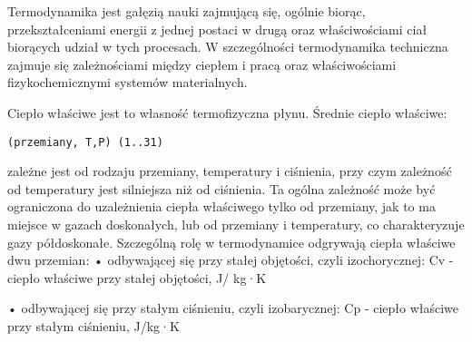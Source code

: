 \documentclass[]{article}
\date{}
\begin{document}
Termodynamika jest gałęzią nauki zajmującą się, ogólnie biorąc,
przekształceniami energii z jednej postaci w drugą oraz właściwościami
ciał biorących udział w tych procesach. W szczególności termodynamika
techniczna zajmuje się zależnościami między ciepłem i pracą oraz
właściwościami fizykochemicznymi systemów materialnych.

Ciepło właściwe jest to własność termofizyczna płynu. Średnie ciepło
właściwe:

\texttt{(przemiany,~T,P)~(1..31)}

zależne jest od rodzaju przemiany, temperatury i ciśnienia, przy czym
zależność od temperatury jest silniejsza niż od ciśnienia. Ta ogólna
zależność może być ograniczona do uzależnienia ciepła właściwego tylko
od przemiany, jak to ma miejsce w gazach doskonałych, lub od przemiany i
temperatury, co charakteryzuje gazy półdoskonałe. Szczególną rolę w
termodynamice odgrywają ciepła właściwe dwu przemian: • odbywającej się
przy stałej objętości, czyli izochorycznej: Cv - ciepło właściwe przy
stałej objętości, J/ kg·K

• odbywającej się przy stałym ciśnieniu, czyli izobarycznej: Cp - ciepło
właściwe przy stałym ciśnieniu, J/kg·K
\end{document}
